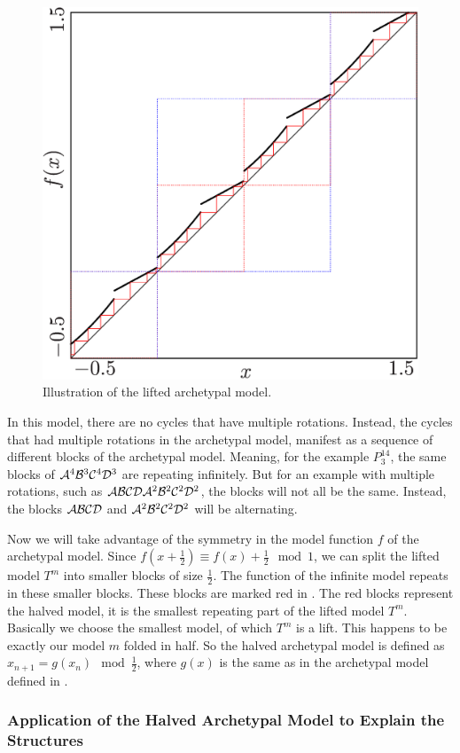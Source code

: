 \begin{figure}
	\centering
	\includegraphics[width=.7 \textwidth]{../Figures/7/7.18/result.png}
	\caption[Illustration of the lifted archetypal model]{
		Illustration of the lifted archetypal model.
	}
	\label{fig:add.halved.lift}
\end{figure}

In this model, there are no cycles that have multiple rotations.
Instead, the cycles that had multiple rotations in the archetypal model, manifest as a sequence of different blocks of the archetypal model.
Meaning, for the example $P^{14}_3$, the same blocks of $\mathcal{A}^4\mathcal{B}^3\mathcal{C}^4\mathcal{D}^3$ are repeating infinitely.
But for an example with multiple rotations, such as $\mathcal{A}\mathcal{B}\mathcal{C}\mathcal{D}\mathcal{A}^2\mathcal{B}^2\mathcal{C}^2\mathcal{D}^2$, the blocks will not all be the same.
Instead, the blocks $\mathcal{A}\mathcal{B}\mathcal{C}\mathcal{D}$ and $\mathcal{A}^2\mathcal{B}^2\mathcal{C}^2\mathcal{D}^2$ will be alternating.

Now we will take advantage of the symmetry in the model function $f$ of the archetypal model.
Since $f\left(x + \frac{1}{2}\right) \equiv f(x) + \frac{1}{2} \mod 1$, we can split the lifted model $T^m$ into smaller blocks of size $\frac{1}{2}$.
The function of the infinite model repeats in these smaller blocks.
These blocks are marked red in .
The red blocks represent the halved model, it is the smallest repeating part of the lifted model $T^m$.
Basically we choose the smallest model, of which $T^m$ is a lift.
This happens to be exactly our model $m$ folded in half.
So the halved archetypal model is defined as $x_{n+1} = g(x_n) \mod \frac{1}{2}$, where $g(x)$ is the same as in the archetypal model defined in .

\subsubsection{Application of the Halved Archetypal Model to Explain the  Structures}

